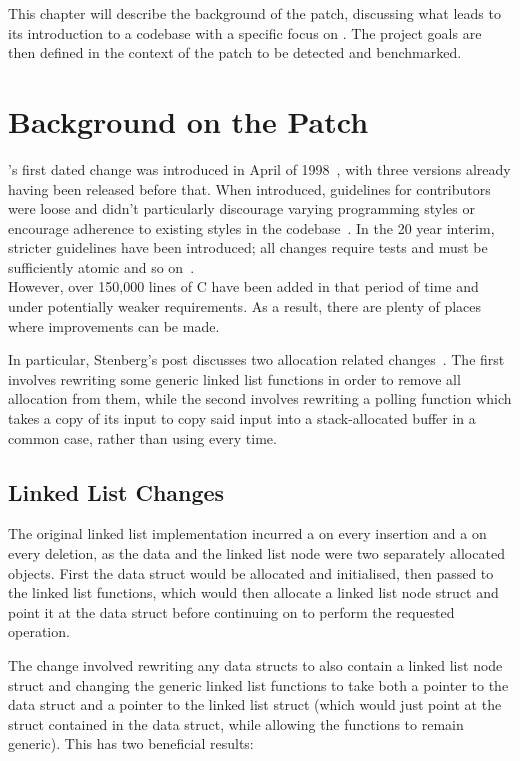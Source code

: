 This chapter will describe the background of the patch, discussing what leads to its introduction to a codebase with a specific focus on . The project goals are then defined in the context of the patch to be detected and benchmarked.

\section{Background on the Patch}

's first dated change was introduced in April of 1998~\cite{curlrelease}, with three versions already having been released before that. When introduced, guidelines for contributors were loose and didn't particularly discourage varying programming styles or encourage adherence to existing styles in the codebase~\cite{curlcontribute1999}. In the 20 year interim, stricter guidelines have been introduced; all changes require tests and must be sufficiently atomic and so on~\cite{curlcontribute2017}.\\
However, over 150,000 lines of C have been added in that period of time and under potentially weaker requirements. As a result, there are plenty of places where improvements can be made.

In particular, Stenberg's post discusses two allocation related changes~\cite{curlmalloc}. The first involves rewriting some generic linked list functions in order to remove all allocation from them, while the second involves rewriting a polling function which takes a copy of its input to copy said input into a stack-allocated buffer in a common case, rather than using \malloc{} every time.

\subsection{Linked List Changes}

The original linked list implementation incurred a \malloc{} on every insertion and a \free{} on every deletion, as the data and the linked list node were two separately allocated objects. First the data struct would be allocated and initialised, then passed to the linked list functions, which would then allocate a linked list node struct and point it at the data struct before continuing on to perform the requested operation.

The change involved rewriting any data structs to also contain a linked list node struct and changing the generic linked list functions to take both a pointer to the data struct and a pointer to the linked list struct (which would just point at the struct contained in the data struct, while allowing the functions to remain generic). This has two beneficial results:

